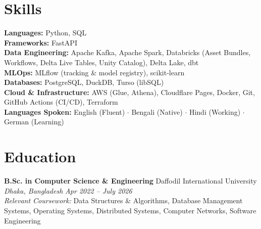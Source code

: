 \documentclass[10.5pt,letterpaper]{article}
\newcommand{\role}[4]{%
  \textbf{#1} \hfill #2 \\
  \textit{#3} \hfill \textit{#4}%
}
\begin{document}
\section*{Skills}
\textbf{Languages:} Python, SQL \\
\textbf{Frameworks:} FastAPI \\
\textbf{Data Engineering:} Apache Kafka, Apache Spark, Databricks (Asset Bundles, Workflows, Delta Live Tables, Unity Catalog), Delta Lake, dbt \\
\textbf{MLOps:} MLflow (tracking \& model registry), scikit-learn \\
\textbf{Databases:} PostgreSQL, DuckDB, Turso (libSQL) \\
\textbf{Cloud \& Infrastructure:} AWS (Glue, Athena), Cloudflare Pages, Docker, Git, GitHub Actions (CI/CD), Terraform \\
\textbf{Languages Spoken:} English (Fluent) $\cdot$ Bengali (Native) $\cdot$ Hindi (Working) $\cdot$ German (Learning)


\section*{Education}
\role{B.Sc. in Computer Science \& Engineering}{Daffodil International University}{Dhaka, Bangladesh}{Apr 2022 -- July 2026}\\[2pt]
\textit{Relevant Coursework:} Data Structures \& Algorithms, Database Management Systems, Operating Systems, Distributed Systems, Computer Networks, Software Engineering
\end{document}
